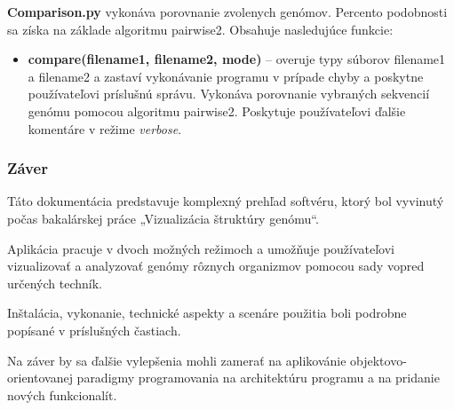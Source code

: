 \textbf{\selectfont Comparison.py} vykonáva porovnanie zvolenych genómov. Percento podobnosti sa získa na základe algoritmu pairwise2.
Obsahuje nasledujúce funkcie:
\begin{itemize}
  \item \textbf{\selectfont compare(filename1, filename2, mode)} -- overuje typy súborov {\selectfont filename1} a {\selectfont filename2} a zastaví vykonávanie programu v prípade chyby a poskytne používateľovi príslušnú správu. Vykonáva porovnanie vybraných sekvencií genómu pomocou algoritmu pairwise2. Poskytuje používateľovi ďalšie komentáre v režime \textit{verbose}.
\end{itemize}

\subsubsection{\Large{Záver}}
Táto dokumentácia predstavuje komplexný prehľad softvéru, ktorý bol vyvinutý počas bakalárskej práce „Vizualizácia štruktúry genómu“.

Aplikácia pracuje v dvoch možných režimoch a umožňuje používateľovi vizualizovať a analyzovať genómy rôznych organizmov pomocou sady vopred určených techník.

Inštalácia, vykonanie, technické aspekty a scenáre použitia boli podrobne popísané v príslušných častiach.

Na záver by sa ďalšie vylepšenia mohli zamerať na aplikovánie objektovo-orientovanej paradigmy programovania na architektúru programu a na pridanie nových funkcionalít.

